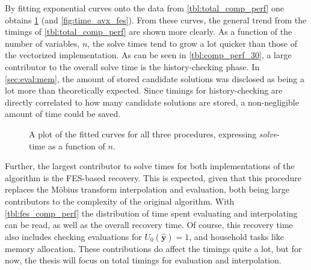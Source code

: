 By fitting exponential curves onto the data from \cref{tbl:total_comp_perf} one obtains \cref{fig:time_dinur_fes} (and \cref{fig:time_avx_fes}). From these curves, the general trend from the timings of \cref{tbl:total_comp_perf} are shown more clearly. As a function of the number of variables, $n$, the solve times tend to grow a lot quicker than those of the vectorized implementation. As can be seen in \cref{tbl:comp_perf_30}, a large contributor to the overall solve time is the history-checking phase. In \cref{sec:eval:mem}, the amount of stored candidate solutions was disclosed as being a lot more than theoretically expected. Since timings for history-checking are directly correlated to how many candidate solutions are stored, a non-negligible amount of time could be saved.

\begin{figure}[t]
    \centering
    \caption{A plot of the fitted curves for all three procedures, expressing \textit{solve}-time as a function of $n$.} \label{fig:time_dinur_fes}
\end{figure}

Further, the largest contributor to solve times for both implementations of the algorithm is the FES-based recovery. This is expected, given that this procedure replaces the Möbius transform interpolation and evaluation, both being large contributors to the complexity of the original algorithm. With \cref{tbl:fes_comp_perf} the distribution of time spent evaluating and interpolating can be read, as well as the overall recovery time. Of course, this recovery time also includes checking evaluations for $U_0(\hat{\mathbf{y}}) = 1$, and household tasks like memory allocation. These contributions do affect the timings quite a lot, but for now, the thesis will focus on total timings for evaluation and interpolation.

